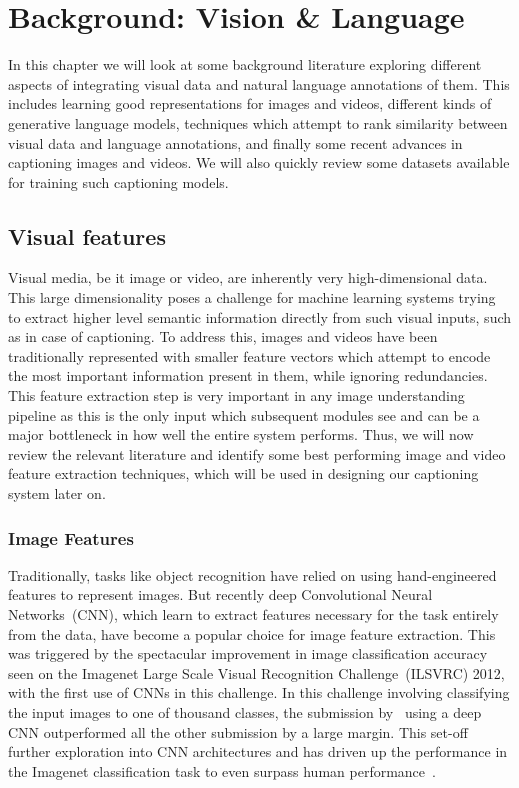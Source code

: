 \chapter{Background: Vision \& Language} \label{chapter:background} 
In this chapter we will look at some background literature exploring different
aspects of integrating visual data and natural language annotations of them.
This includes learning good representations for images and videos, different
kinds of generative language models, techniques which attempt to rank similarity
between visual data and language annotations, and finally some recent advances
in captioning images and videos.
We will also quickly review some datasets available for training such captioning
models.

\section{Visual features}
Visual media, be it image or video, are inherently very high-dimensional data.
This large dimensionality poses a challenge for machine learning systems trying
to extract higher level semantic information directly from such visual inputs, such as in
case of captioning.
To address this, images and videos have been traditionally represented with
smaller feature vectors which attempt to encode the most important information
present in them, while ignoring redundancies. 
This feature extraction step is very important in any image understanding
pipeline as this is the only input which subsequent modules see and can be a
major bottleneck in how well the entire system performs. 
Thus, we will now review the relevant literature and identify some best
performing image and video feature extraction techniques, which will be used in
designing our captioning system later on.

\subsection{Image Features}
Traditionally, tasks like object recognition have relied on using
hand-engineered features to represent images. 
But recently deep Convolutional Neural Networks~(CNN), which learn to extract features
necessary for the task entirely from the data, have become a popular choice for
image feature extraction.
This was triggered by the spectacular improvement in image classification
accuracy seen on the Imagenet Large Scale Visual Recognition Challenge~(ILSVRC)
2012, with the first use of CNNs in this challenge.
In this challenge involving classifying the input images to one of thousand
classes, the submission by~\cite{Krizhevsky2012} using a deep CNN outperformed
all the other submission by a large margin.
This set-off further exploration into CNN architectures and has driven up the
performance in the Imagenet classification task to even surpass human
performance~\cite{he2015delving}.

